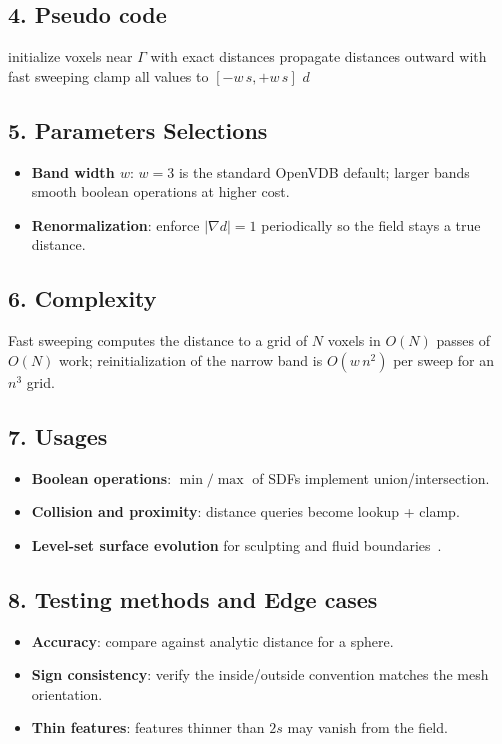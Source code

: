 \subsection{4. Pseudo code}
\begin{algorithmic}
    \State initialize voxels near $\Gamma$ with exact distances
    \State propagate distances outward with fast sweeping
    \State clamp all values to $[{-w\,s}, +w\,s]$
    \State \Return $d$
\EndFunction
\end{algorithmic}

\subsection{5. Parameters Selections}
\begin{itemize}
    \item \textbf{Band width $w$}: $w = 3$ is the standard OpenVDB default; larger bands smooth boolean operations at higher cost.
    \item \textbf{Renormalization}: enforce $|\nabla d| = 1$ periodically so the field stays a true distance.
\end{itemize}

\subsection{6. Complexity}
Fast sweeping computes the distance to a grid of $N$ voxels in $O(N)$ passes
of $O(N)$ work; reinitialization of the narrow band is $O(w\,n^2)$ per sweep
for an $n^3$ grid.

\subsection{7. Usages}
\begin{itemize}
    \item \textbf{Boolean operations}: $\min/\max$ of SDFs implement union/intersection.
    \item \textbf{Collision and proximity}: distance queries become lookup + clamp.
    \item \textbf{Level-set surface evolution} for sculpting and fluid boundaries~\cite{osher2003}.
\end{itemize}

\subsection{8. Testing methods and Edge cases}
\begin{itemize}
    \item \textbf{Accuracy}: compare against analytic distance for a sphere.
    \item \textbf{Sign consistency}: verify the inside/outside convention matches the mesh orientation.
    \item \textbf{Thin features}: features thinner than $2s$ may vanish from the field.
\end{itemize}


